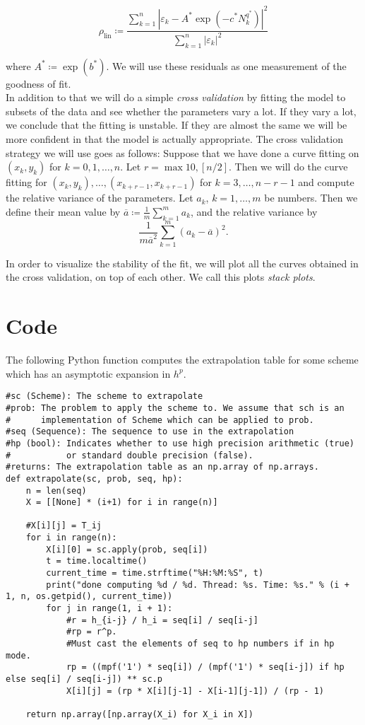 \[
\rho_{\operatorname{lin}}\coloneqq \frac{\sum_{k=1}^n|\varepsilon_k - A^*\exp(-c^*N_k^{q^*})|^2}{\sum_{k=1}^n|\varepsilon_k|^2}
\]

where \(A^*\coloneqq \exp(b^*)\). We will use these residuals as one measurement of the goodness of fit.\\

In addition to that we will do a simple {\it cross validation} by fitting the model to subsets of the data and see whether the parameters vary a lot. If they vary a lot, we conclude that the fitting is unstable. If they are almost the same we will be more confident in that the model is actually appropriate. The cross validation strategy we will use goes as follows: Suppose that we have done a curve fitting on \((x_k,y_k)\) for \(k=0,1,\ldots,n\). Let \(r = \max{10, [n/2]}\). Then we will do the curve fitting for \((x_k,y_k), \ldots, (x_{k+r-1},x_{k+r-1})\) for \(k=3,\ldots,n-r-1\) and compute the relative variance of the parameters. Let \(a_k\), \(k=1,\ldots, m\) be numbers. Then we define their mean value by \(\overline{a} \coloneqq \frac{1}{m}\sum_{k=1}^m a_k\), and the relative variance by 
\[
\frac{1}{m\overline{a}^2}\sum_{k=1}^m (a_k - \overline{a})^2. 
\]

In order to visualize the stability of the fit, we will plot all the curves obtained in the cross validation, on top of each other. We call this plots {\it stack plots}. 
\section{Code}

The following Python function computes the extrapolation table for some scheme which has an asymptotic expansion in \(h^p\).

\begin{verbatim}
#sc (Scheme): The scheme to extrapolate	
#prob: The problem to apply the scheme to. We assume that sch is an 
#      implementation of Scheme which can be applied to prob.
#seq (Sequence): The sequence to use in the extrapolation
#hp (bool): Indicates whether to use high precision arithmetic (true) 
#           or standard double precision (false).
#returns: The extrapolation table as an np.array of np.arrays.
def extrapolate(sc, prob, seq, hp):
	n = len(seq)
	X = [[None] * (i+1) for i in range(n)]

	#X[i][j] = T_ij
	for i in range(n):
		X[i][0] = sc.apply(prob, seq[i])
		t = time.localtime()
		current_time = time.strftime("%H:%M:%S", t)
		print("done computing %d / %d. Thread: %s. Time: %s." % (i + 1, n, os.getpid(), current_time))
		for j in range(1, i + 1):
			#r = h_{i-j} / h_i = seq[i] / seq[i-j]
			#rp = r^p.
			#Must cast the elements of seq to hp numbers if in hp mode.
			rp = ((mpf('1') * seq[i]) / (mpf('1') * seq[i-j]) if hp else seq[i] / seq[i-j]) ** sc.p
			X[i][j] = (rp * X[i][j-1] - X[i-1][j-1]) / (rp - 1)

	return np.array([np.array(X_i) for X_i in X])
\end{verbatim}
